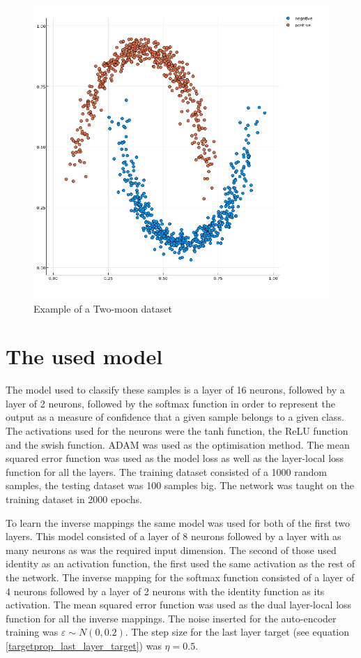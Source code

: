 \begin{figure}[h]
	\centering
	\includegraphics[width=400pt]{images/temp-twomoon.png}
	\caption{Example of a Two-moon dataset}\label{twomoon}
\end{figure}


\section{The used model}

The model used to classify these samples is a layer of 16 neurons, followed by a layer of 2 neurons, followed by the softmax function in order to represent the output as a measure of confidence that a given sample belongs to a given class. The activations used for the neurons were the tanh function, the ReLU function  and the swish function. ADAM  was used as the optimisation method. The mean squared error function was used as the model loss as well as the layer-local loss function for all the layers. The training dataset consisted of a 1000 random samples, the testing dataset was 100 samples big. The network was taught on the training dataset in 2000 epochs.

To learn the inverse mappings the same model was used for both of the first two layers. This model consisted of a layer of 8 neurons followed by a layer with as many neurons as was the required input dimension. The second of those used identity as an activation function, the first used the same activation as the rest of the network. The inverse mapping for the softmax function consisted of a layer of 4 neurons followed by a layer of 2 neurons with the identity function as its activation. The mean squared error function was used as the dual layer-local loss function for all the inverse mappings. The noise inserted for the auto-encoder training was \( \varepsilon \sim N \left( 0, 0.2 \right) \). The step size for the last layer target (see equation \ref{targetprop_last_layer_target}) was \( \eta = 0.5 \).

